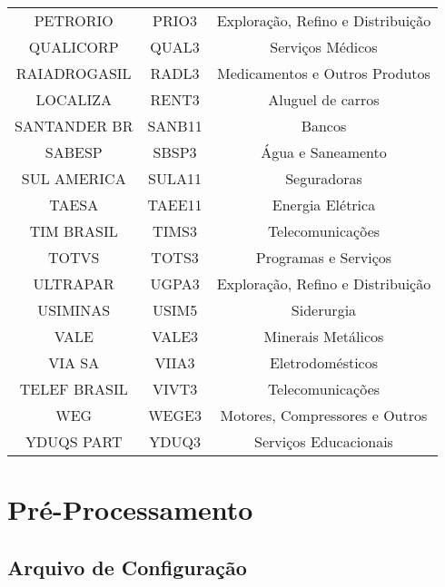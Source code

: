 \begin{center}
{\begin{longtable}[c]{ccc}
            PETRORIO & PRIO3 & Exploração, Refino e Distribuição \\
            QUALICORP & QUAL3 & Serviços Médicos \\
            RAIADROGASIL & RADL3 & Medicamentos e Outros Produtos \\
            LOCALIZA & RENT3 & Aluguel de carros \\
            SANTANDER BR & SANB11 & Bancos \\
            SABESP & SBSP3 & Água e Saneamento \\
            SUL AMERICA & SULA11 & Seguradoras \\
            TAESA & TAEE11 & Energia Elétrica \\
            TIM BRASIL & TIMS3 & Telecomunicações \\
            TOTVS & TOTS3 & Programas e Serviços \\
            ULTRAPAR & UGPA3 & Exploração, Refino e Distribuição \\
            USIMINAS & USIM5 & Siderurgia \\
            VALE & VALE3 & Minerais Metálicos \\
            VIA SA & VIIA3 & Eletrodomésticos \\
            TELEF BRASIL & VIVT3 & Telecomunicações \\
            WEG & WEGE3 & Motores, Compressores e Outros \\
            YDUQS PART & YDUQ3 & Serviços Educacionais \\


        \end{longtable}}
    \end{center}




\FloatBarrier
\section{Pré-Processamento}

\FloatBarrier
\subsection{Arquivo de Configuração}
\label{sub:conf_file}

